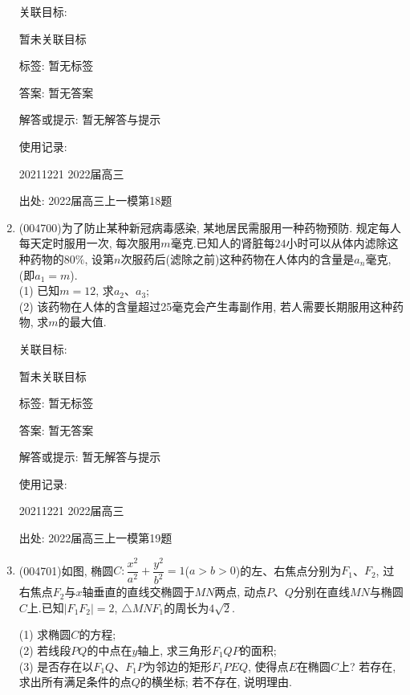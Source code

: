 \documentclass[10pt,a4paper]{article}
\begin{document}
\begin{enumerate}[1.]
关联目标:

暂未关联目标



标签: 暂无标签

答案: 暂无答案

解答或提示: 暂无解答与提示

使用记录:

20211221	2022届高三		


出处: 2022届高三上一模第18题
\item { (004700)}为了防止某种新冠病毒感染, 某地居民需服用一种药物预防. 规定每人每天定时服用一次, 每次服用$m$毫克.已知人的肾脏每$24$小时可以从体内滤除这种药物的$80\%$, 设第$n$次服药后(滤除之前)这种药物在人体内的含量是$a_n$毫克, (即$a_1=m$).\\
(1)	已知$m=12$, 求$a_2$、$a_3$;\\
(2)	该药物在人体的含量超过25毫克会产生毒副作用, 若人需要长期服用这种药物, 求$m$的最大值.


关联目标:

暂未关联目标



标签: 暂无标签

答案: 暂无答案

解答或提示: 暂无解答与提示

使用记录:

20211221	2022届高三		


出处: 2022届高三上一模第19题
\item { (004701)}如图, 椭圆$C:\dfrac{x^2}{a^2}+\dfrac{y^2}{b^2}=1$($a>b>0$)的左、右焦点分别为$F_1$、$F_2$, 过右焦点$F_2$与$x$轴垂直的直线交椭圆于$MN$两点, 动点$P$、$Q$分别在直线$MN$与椭圆$C$上.已知$|F_1F_2|=2$, $\triangle MNF_1$的周长为$4\sqrt 2$.\\
\begin{center}
\end{center}
(1)	求椭圆$C$的方程;\\
(2)	若线段$PQ$的中点在$y$轴上, 求三角形$F_1QP$的面积;\\
(3)	是否存在以$F_1Q$、$F_1P$为邻边的矩形$F_1PEQ$, 使得点$E$在椭圆$C$上? 若存在, 求出所有满足条件的点$Q$的横坐标; 若不存在, 说明理由.



\end{enumerate}
\end{document}
